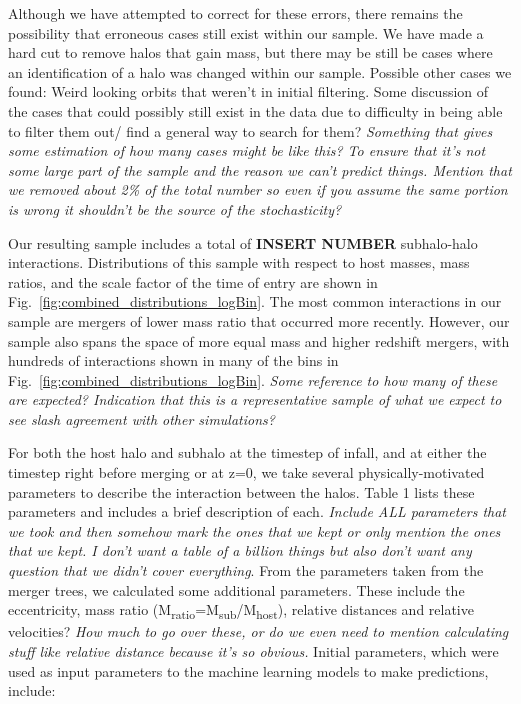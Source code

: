 \documentclass[fleqn,usenatbib]{mnras}
\begin{document}
\par
	Although we have attempted to correct for these errors, there remains the possibility that erroneous cases still exist within our sample. We have made a hard cut to remove halos that gain mass, but there may be still be cases where an identification of a halo was changed within our sample. Possible other cases we found: Weird looking orbits that weren't in initial filtering. Some discussion of the cases that could possibly still exist in the data due to difficulty in being able to filter them out/ find a general way to search for them? \textit{Something that gives some estimation of how many cases might be like this? To ensure that it's not some large part of the sample and the reason we can't predict things. Mention that we removed about 2\% of the total number so even if you assume the same portion is wrong it shouldn't be the source of the stochasticity?}
\par
    Our resulting sample includes a total of \textbf{INSERT NUMBER} subhalo-halo interactions. Distributions of this sample with respect to host masses, mass ratios, and the scale factor of the time of entry are shown in Fig.~\ref{fig:combined_distributions_logBin}. The most common interactions in our sample are mergers of lower mass ratio that occurred more recently. However, our sample also spans the space of more equal mass and higher redshift mergers, with hundreds of interactions shown in many of the bins in Fig.~\ref{fig:combined_distributions_logBin}. \textit{Some reference to how many of these are expected? Indication that this is a representative sample of what we expect to see slash agreement with other simulations?}
\par
    For both the host halo and subhalo at the timestep of infall, and at either the timestep right before merging or at z=0, we take several physically-motivated parameters to describe the interaction between the halos. Table 1 lists these parameters and includes a brief description of each. \textit{Include ALL parameters that we took and then somehow mark the ones that we kept or only mention the ones that we kept. I don't want a table of a billion things but also don't want any question that we didn't cover everything}. From the parameters taken from the merger trees, we calculated some additional parameters. These include the eccentricity, mass ratio (M\textsubscript{ratio}=M\textsubscript{sub}/M\textsubscript{host}), relative distances and relative velocities? \textit{How much to go over these, or do we even need to mention calculating stuff like relative distance because it's so obvious.} Initial parameters, which were used as input parameters to the machine learning models to make predictions, include:
    
\end{document}
